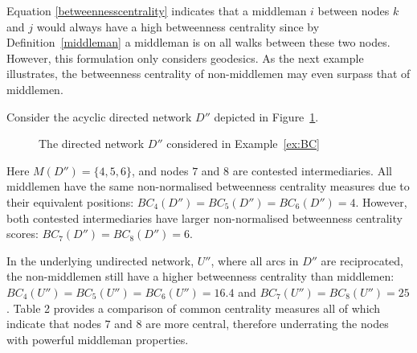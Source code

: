 Equation \ref{betweennesscentrality} indicates that a middleman $i$ between nodes $k$ and $j$ would always have a high betweenness centrality since by Definition~\ref{middleman} a middleman is on all walks between these two nodes. However, this formulation only considers geodesics. As the next example illustrates, the betweenness centrality of non-middlemen may even surpass that of middlemen.
\begin{example} \label{ex:BC}
Consider the acyclic directed network $D''$ depicted in Figure~\ref{mmnmm}.

\begin{figure}[h]
\begin{center}
\end{center}
\caption[Differentiating betweenness and middlemen]{The directed network $D''$ considered in Example~\ref{ex:BC}}
\label{mmnmm}
\end{figure}

\noindent Here $M(D'') = \{ 4, 5, 6 \}$, and nodes $7$ and $8$ are contested intermediaries. All middlemen have the same non-normalised betweenness centrality measures due to their equivalent positions: $BC_{4}(D'')=BC_{5}(D'')=BC_{6}(D'')=4$. However, both contested intermediaries have larger non-normalised betweenness centrality scores: $BC_{7}(D'')=BC_{8}(D'')=6$.

In the underlying undirected network, $U''$, where all arcs in $D''$ are reciprocated, the non-middlemen still have a higher betweenness centrality than middlemen: $BC_{4}(U'')=BC_{5}(U'')=BC_{6}(U'')=16.4$ and $BC_{7}(U'')=BC_{8}(U'')=25$. Table 2 provides a comparison of common centrality measures all of which indicate that nodes $7$ and $8$ are more central, therefore underrating the nodes with powerful middleman properties.
\end{example}

